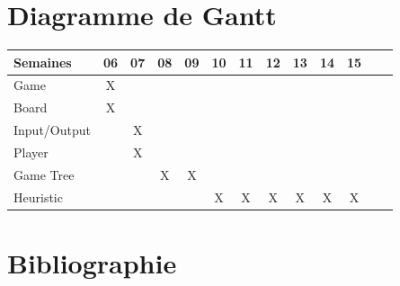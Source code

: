 \documentclass[10pt,a4paper]{article}
\begin{document}
\newpage
\section{Diagramme de Gantt}
\begin{center}
  \begin{tabular}{| l | c | c | c | c | c | c | c | c | c | c | c | c |}
    \hline
    Semaines     & 06 & 07 & 08 & 09 & 10 & 11 & 12 & 13 & 14 & 15  \\ \hline
    Game         & X  &    &    &    &    &    &    &    &    &     \\ \hline
    Board        & X  &    &    &    &    &    &    &    &    &     \\ \hline
    Input/Output &    & X  &    &    &    &    &    &    &    &     \\ \hline
    Player       &    & X  &    &    &    &    &    &    &    &     \\ \hline
    Game Tree    &    &    & X  & X  &    &    &    &    &    &     \\ \hline
    Heuristic    &    &    &    &    &  X & X  & X  & X  & X  & X   \\ \hline
  \end{tabular}
\end{center}

\section{Bibliographie}
\end{document}
